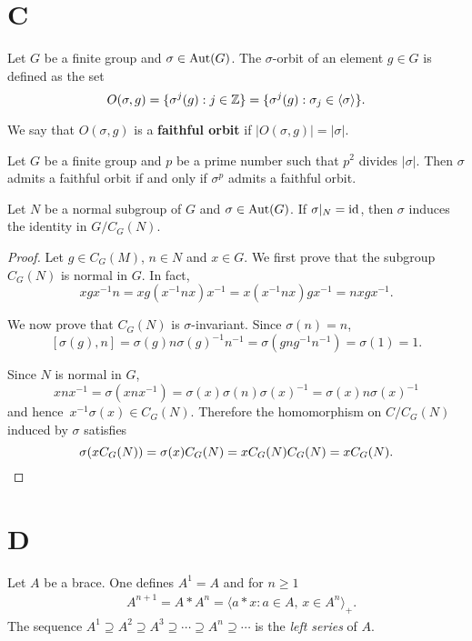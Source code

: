 
\section*{C}

Let $G$ be a finite group and $\sigma\in\operatorname{Aut}(G)$. The $\sigma$-orbit of an element $g\in G$ is defined
as the set
\[
O(\sigma,g)=\{\sigma^j(g):j\in\mathbb{Z}\}=\{\sigma^j(g):\sigma_j\in\langle\sigma\rangle\}.
\]

We say that $O(\sigma,g)$ is a \textbf{faithful orbit} if $|O(\sigma,g)|=|\sigma|$. 

\begin{lemma}
Let $G$ be a finite group and $p$ be a prime number such that $p^2$ divides $|\sigma|$. 
Then $\sigma$ admits a faithful orbit if and only if $\sigma^p$ admits a faithful orbit. 	
\end{lemma}



\begin{lemma}
Let $N$ be a normal subgroup of $G$ and $\sigma\in\operatorname{Aut}(G)$. If $\sigma|_N=\operatorname{id}$, then 
$\sigma$ induces the identity in $G/C_G(N)$. 	
\end{lemma}

\begin{proof}
 	Let $g\in C_G(M)$, $n\in N$ and $x\in G$.
	We first prove that 	the subgroup $C_G(N)$ is normal in $G$. In fact,  
	\[
	xgx^{-1}n=xg(x^{-1}nx)x^{-1}=x(x^{-1}nx)gx^{-1}=nxgx^{-1}.
	\]
	
	We now prove that $C_G(N)$ is $\sigma$-invariant. Since $\sigma(n)=n$, 
	\[
	[\sigma(g),n]=\sigma(g)n\sigma(g)^{-1}n^{-1}=\sigma(gng^{-1}n^{-1})=\sigma(1)=1.
	\] 
	
	Since $N$ is normal in $G$, 
	\[
	xnx^{-1}=\sigma(xnx^{-1})=\sigma(x)\sigma(n)\sigma(x)^{-1}=\sigma(x)n\sigma(x)^{-1}
	\]
	and hence $x^{-1}\sigma(x)\in C_G(N)$. Therefore the homomorphism on $C/C_G(N)$ induced
	by $\sigma$ satisfies   
	\[
	\sigma(xC_G(N))=\sigma(x)C_G(N)=xC_G(N)C_G(N)=xC_G(N).\qedhere
	\]
\end{proof}



\section*{D}

\begin{definition}
Let $A$ be a brace. One defines
$A^1=A$ and for $n\geq1$
\begin{align*}
    & A^{n+1}=A*A^{n}=\langle a*x: a\in A,\,x\in A^{n}\rangle_+.
\end{align*}
The sequence $A^1\supseteq A^2\supseteq A^3\supseteq\cdots\supseteq A^n\supseteq\cdots$
is the \emph{left series} of $A$.
\end{definition}

